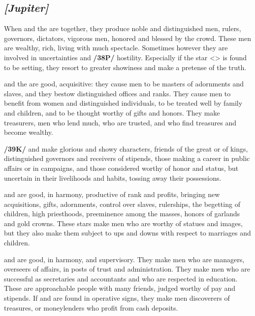 \secbr
{}
\subsection{\textit{[Jupiter]}}
When \Jupiter\xspace and the \Sun\xspace are together, they produce noble and distinguished men, rulers, governors,
dictators, vigorous men, honored and blessed by the crowd. These men are wealthy, rich, living with much spectacle. Sometimes however they are involved in uncertainties and \textbf{/38P/} hostility. Especially if the star <\Jupiter> is found to be setting, they resort to greater showiness and make a pretense of the truth.

\Jupiter\xspace and the \Moon\xspace are good, acquisitive: they cause men to be masters of adornments and slaves, and they bestow distinguished offices and ranks. They cause men to benefit from women and distinguished individuals, to be treated well by family and children, and to be thought worthy of gifts and honors. They make treasurers, men who lend much, who are trusted, and who find treasures and become wealthy.

\textbf{/39K/}\Jupiter\xspace and \Mars\xspace make glorious and showy characters, friends of the great or of kings,
distinguished governors and receivers of stipends, those making a career in public affairs or in campaigns, and those considered worthy of honor and status, but uncertain in their livelihoods and habits, tossing away their possessions.

\Jupiter\xspace and \Venus\xspace are good, in harmony, productive of rank and profits, bringing new acquisitions,
gifts, adornments, control over slaves, rulerships, the begetting of children, high priesthoods, preeminence among the masses, honors of garlands and gold crowns. These stars make men who are worthy of statues and images, but they also make them subject to ups and downs with respect to marriages and children.

\Jupiter\xspace and \Mercury\xspace are good, in harmony, and supervisory. They make men who are managers, overseers of affairs, in posts of trust and administration. They make men who are successful as secretaries and accountants and who are respected in education. These are approachable people with many friends, judged worthy of pay and stipends. If \Jupiter\xspace and \Mercury\xspace are found in operative signs, they make men
discoverers of treasures, or moneylenders who profit from cash deposits.

\secbr
{}
